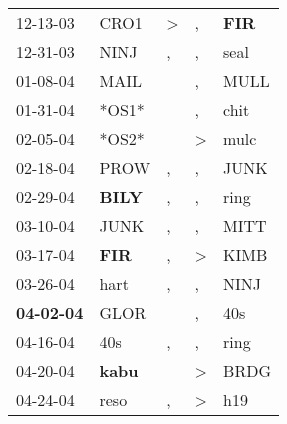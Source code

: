 \begin{supertabular}{p{0.07\textwidth}p{0.06\textwidth}p{0.02\textwidth}p{0.02\textwidth}p{0.06\textwidth}}
          12-13-03\textsuperscript{} &           CRO1\textsuperscript{} &     \textgreater &                , &   \textbf{FIR\textsuperscript{}} \\
          12-31-03\textsuperscript{} &           NINJ\textsuperscript{} &                , &                , &           seal\textsuperscript{} \\
          01-08-04\textsuperscript{} &           MAIL\textsuperscript{} &                  &                , &           MULL\textsuperscript{} \\
          01-31-04\textsuperscript{} &                            *OS1* &                  &                , &           chit\textsuperscript{} \\
          02-05-04\textsuperscript{} &                            *OS2* &                  &     \textgreater &           mulc\textsuperscript{} \\
          02-18-04\textsuperscript{} &           PROW\textsuperscript{} &                , &                , &           JUNK\textsuperscript{} \\
          02-29-04\textsuperscript{} &  \textbf{BILY\textsuperscript{}} &                , &                , &           ring\textsuperscript{} \\
          03-10-04\textsuperscript{} &           JUNK\textsuperscript{} &                , &                , &           MITT\textsuperscript{} \\
          03-17-04\textsuperscript{} &   \textbf{FIR\textsuperscript{}} &                , &     \textgreater &           KIMB\textsuperscript{} \\
          03-26-04\textsuperscript{} &           hart\textsuperscript{} &                , &                , &           NINJ\textsuperscript{} \\
 \textbf{04-02-04\textsuperscript{}} &           GLOR\textsuperscript{} &                  &                , &            40s\textsuperscript{} \\
          04-16-04\textsuperscript{} &            40s\textsuperscript{} &                , &                , &           ring\textsuperscript{} \\
          04-20-04\textsuperscript{} &  \textbf{kabu\textsuperscript{}} &                  &     \textgreater &           BRDG\textsuperscript{} \\
          04-24-04\textsuperscript{} &           reso\textsuperscript{} &                , &     \textgreater &            h19\textsuperscript{} \\

\end{supertabular}
